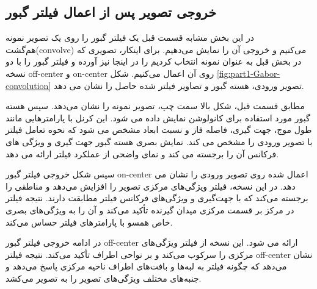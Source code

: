         \subsection{خروجی تصویر پس از اعمال فیلتر گبور}
            در این بخش مشابه قسمت قبل یک فیلتر گبور را روی یک تصویر نمونه هم‌گشت(convolve)
            می‌کنیم و خروجی آن را نمایش می‌دهیم.
            برای اینکار، تصویری که در بخش قبل به عنوان نمونه انتخاب کردیم را در اینجا نیز آورده و فیلتر گبور را با دو نسخه 
            off-center و on-center 
            روی آن اعمال می‌کنیم. شکل 
            \ref{fig:part1-Gabor-convolution}
            تصویر ورودی، هسته گبور و تصاویر فیلتر شده حاصل را نشان می دهد.

            مطابق قسمت قبل، شکل بالا سمت چپ، تصویر نمونه را نشان می‌دهد.
            سپس هسته گبور مورد استفاده برای کانولوشن نمایش داده می شود. این کرنل با پارامترهایی مانند طول موج، جهت گیری، فاصله فاز و نسبت ابعاد مشخص می شود که نحوه تعامل فیلتر با تصویر ورودی را مشخص می کند. نمایش بصری هسته گبور جهت گیری و ویژگی های فرکانس آن را برجسته می کند و نمای واضحی از عملکرد فیلتر ارائه می دهد.
            
            سپس شکل خروجی فیلتر گبور 
            on-center
            اعمال شده روی تصویر ورودی را نشان می دهد. در این نسخه، فیلتر ویژگی‌های مرکزی تصویر را افزایش می‌دهد و مناطقی را برجسته می‌کند که با جهت‌گیری و ویژگی‌های فرکانس فیلتر مطابقت دارند. نتیجه فیلتر در مرکز بر قسمت مرکزی میدان گیرنده تأکید می‌کند و آن را به ویژگی‌های بصری خاص همسو با پارامترهای فیلتر حساس می‌کند.

            در ادامه خروجی فیلتر گبور 
            off-center
            ارائه می شود. این نسخه از فیلتر ویژگی‌های مرکزی را سرکوب می‌کند و بر نواحی اطراف تأکید می‌کند. نتیجه فیلتر
            off-center
            نشان می‌دهد که چگونه فیلتر به لبه‌ها و بافت‌های اطراف ناحیه مرکزی پاسخ می‌دهد و جنبه‌های مختلف ویژگی‌های تصویر را به تصویر می‌کشد.

